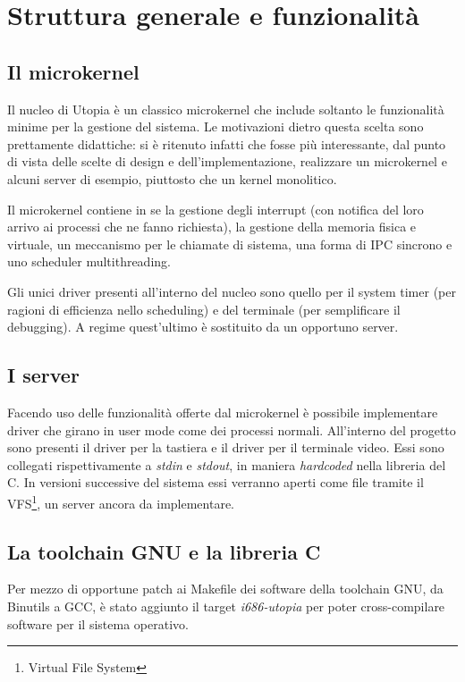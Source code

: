 \documentclass[12pt,a4paper]{report}
\begin{document}
	\section{Struttura generale e funzionalità}
		\subsection{Il microkernel}
			Il nucleo di Utopia è un classico microkernel che include soltanto le funzionalità minime per
			la gestione del sistema.
			Le motivazioni dietro questa scelta sono prettamente didattiche: si è ritenuto infatti che fosse
			più interessante, dal punto di vista delle scelte di design e dell'implementazione, realizzare
			un microkernel e alcuni server di esempio, piuttosto che un kernel monolitico.
		
			Il microkernel contiene in se la gestione degli interrupt (con notifica del loro arrivo ai processi
			che ne fanno richiesta), la gestione della memoria fisica e virtuale, un meccanismo per le chiamate
			di sistema, una forma di IPC sincrono e uno scheduler multithreading.
		
			Gli unici driver presenti all'interno del nucleo sono quello per il system timer (per ragioni
			di efficienza nello scheduling) e del terminale (per semplificare il debugging). A regime
			quest'ultimo è sostituito da un opportuno server.
			
		\subsection{I server}
			Facendo uso delle funzionalità offerte dal microkernel è possibile implementare driver
			che girano in user mode come dei processi normali. All'interno del progetto sono presenti
			il driver per la tastiera e il driver per il terminale video. Essi sono collegati rispettivamente
			a \emph{stdin} e \emph{stdout}, in maniera \emph{hardcoded} nella libreria del C.
			In versioni successive del sistema essi verranno aperti come file tramite il VFS\footnote{Virtual File System},
			un server ancora da implementare.
		
		\subsection{La toolchain GNU e la libreria C}
			Per mezzo di opportune patch ai Makefile dei software della toolchain GNU, da Binutils a GCC,
			è stato aggiunto il target \emph{i686-utopia} per poter cross-compilare software per il sistema operativo.
			
\end{document}
